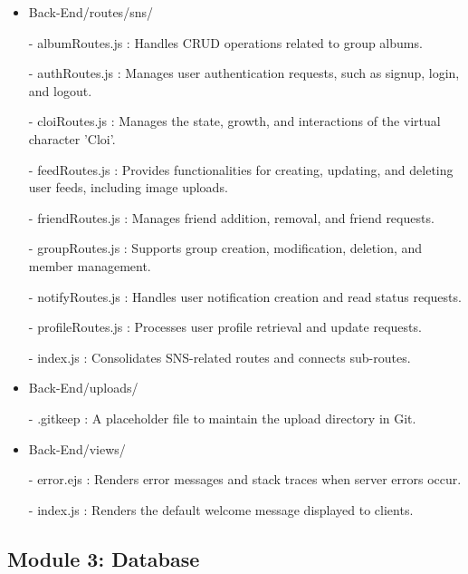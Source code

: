 \documentclass[conference]{IEEEtran}
\begin{document}
\begin{itemize}
                    \item Back-End/routes/sns/
                        \item[-] albumRoutes.js : Handles CRUD operations related to group albums.
                        \item[-] authRoutes.js : Manages user authentication requests, such as signup, login, and logout.
                        \item[-] cloiRoutes.js : Manages the state, growth, and interactions of the virtual character 'Cloi'.
                        \item[-] feedRoutes.js : Provides functionalities for creating, updating, and deleting user feeds, including image uploads.
                        \item[-] friendRoutes.js : Manages friend addition, removal, and friend requests.
                        \item[-] groupRoutes.js : Supports group creation, modification, deletion, and member management.
                        \item[-] notifyRoutes.js : Handles user notification creation and read status requests.
                        \item[-] profileRoutes.js : Processes user profile retrieval and update requests.
                        \item[-] index.js : Consolidates SNS-related routes and connects sub-routes.
                    \vspace{3mm}
                    
                    \item Back-End/uploads/
                        \item[-] .gitkeep : A placeholder file to maintain the upload directory in Git.
                    \vspace{3mm}
                    
                    \item Back-End/views/
                        \item[-] error.ejs : Renders error messages and stack traces when server errors occur.
                        \item[-] index.js : Renders the default welcome message displayed to clients.
                \end{itemize}
        
    \subsection{Module 3: Database}
\end{document}
